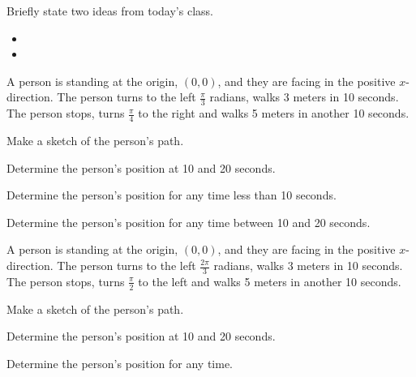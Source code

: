 \postClass

\begin{problem}
\item Briefly state two ideas from today's class.
  \begin{itemize}
  \item 
  \item 
  \end{itemize}
\item A person is standing at the origin, $(0,0)$, and they are facing
  in the positive $x$-direction. The person turns to the left
  $\frac{\pi}{3}$ radians, walks 3 meters in 10 seconds. The person
  stops, turns $\frac{\pi}{4}$ to the right and walks 5 meters in
  another 10 seconds.
  \begin{subproblem}
    \item  Make a sketch of the person's path.
      \vfill
    \item Determine the person's position at 10 and 20 seconds.
      \vfill
    \item Determine the person's position for any time less than 10
      seconds.
      \vfill
    \item Determine the person's position for any time between 10 and
      20 seconds.
      \vfill
  \end{subproblem}
  \clearpage
\item A person is standing at the origin, $(0,0)$, and they are facing
  in the positive $x$-direction. The person turns to the left
  $\frac{2\pi}{3}$ radians, walks 3 meters in 10 seconds. The person
  stops, turns $\frac{\pi}{2}$ to the left and walks 5 meters in
  another 10 seconds.
  \begin{subproblem}
    \item  Make a sketch of the person's path.
      \vfill
    \item Determine the person's position at 10 and 20 seconds.
      \vfill
    \item Determine the person's position for any time.
      \vfill
  \end{subproblem}
\end{problem}


